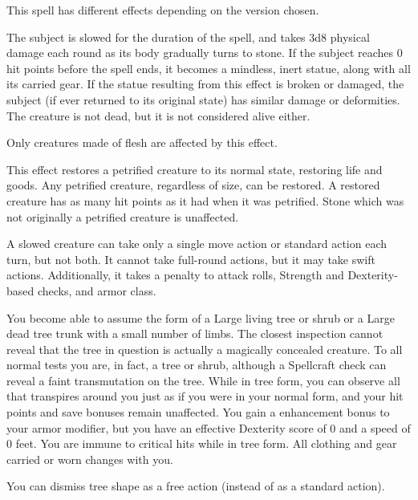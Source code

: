 \spellrng{\rngmed}
\begin{spelleffect}
  This spell has different effects depending on the version chosen.
  \par {} The subject is slowed for the duration of the spell, and takes 3d8 physical damage each round as its body gradually turns to stone. If the subject reaches 0 hit points before the spell ends, it becomes a mindless, inert statue, along with all its carried gear. If the statue resulting from this effect is broken or damaged, the subject (if ever returned to its original state) has similar damage or deformities. The creature is not dead, but it is not considered alive either.
  \par Only creatures made of flesh are affected by this effect.
  \par {} This effect restores a petrified creature to its normal state, restoring life and goods. Any petrified creature, regardless of size, can be restored. A restored creature has as many hit points as it had when it was petrified. Stone which was not originally a petrified creature is unaffected.
\end{spelleffect}
\begin{spellnotes}
A slowed creature can take only a single move action or standard action each turn, but not both. It cannot take full-round actions, but it may take swift actions. Additionally, it takes a  penalty to attack rolls, Strength and Dexterity-based checks, and armor class.
\end{spellnotes}

\begin{spelleffect}
  You become able to assume the form of a Large living tree or shrub or a Large dead tree trunk with a small number of limbs. The closest inspection cannot reveal that the tree in question is actually a magically concealed creature. To all normal tests you are, in fact, a tree or shrub, although a Spellcraft check can reveal a faint transmutation on the tree. While in tree form, you can observe all that transpires around you just as if you were in your normal form, and your hit points and save bonuses remain unaffected. You gain a  enhancement bonus to your armor modifier, but you have an effective Dexterity score of 0 and a speed of 0 feet. You are immune to critical hits while in tree form. All clothing and gear carried or worn changes with you.
\end{spelleffect}
\begin{spellnotes}
  You can dismiss tree shape as a free action (instead of as a standard action).
\end{spellnotes}

